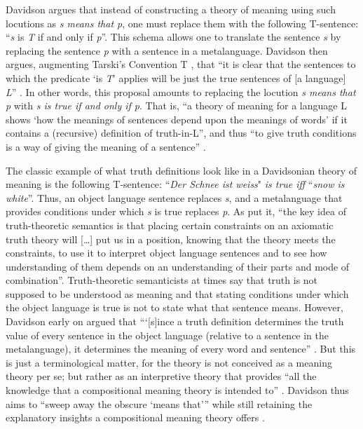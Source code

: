 Davidson argues that instead of constructing a theory of meaning using such locutions as \textit{s means that p}, one must replace them with the following T-sentence: “\textit{s} is \textit{T} if and only if \textit{p}”. This schema allows one to translate the sentence \textit{s} by replacing the sentence \textit{p} with a sentence in a metalanguage. Davidson then argues, augmenting Tarski’s Convention T \citep{Tarski1956}, that “it is clear that the sentences to which the predicate ‘is \textit{T}’ applies will be just the true sentences of [a language] \textit{L}” \citep[309]{Davidson1967}. In other words, this proposal amounts to replacing the locution \textit{s means that p} with \textit{s is true if and only if p}. That is, “a theory of meaning for a language L shows ‘how the meanings of sentences depend upon the meanings of words' if it contains a (recursive) definition of truth-in-L”, and thus “to give truth conditions is a way of giving the meaning of a sentence” \citep[310]{Davidson1967}.

The classic example of what truth definitions look like in a Davidsonian theory of meaning is the following T-sentence: “\textit{Der Schnee ist weiss}" \textit{is true iff} “\textit{snow is white}”. Thus, an object language sentence replaces \textit{s}, and a metalanguage that provides conditions under which \textit{s} is true replaces \textit{p}. As \citet[4]{LeporeLudwig2007} put it, “the key idea of truth-theoretic semantics is that placing certain constraints on an axiomatic truth theory will […] put us in a position, knowing that the theory meets the constraints, to use it to interpret object language sentences and to see how understanding of them depends on an understanding of their parts and mode of combination”. Truth-theoretic semanticists at times say that truth is not supposed to be understood as meaning and that stating conditions under which the object language is true is not to state what that sentence means. However, Davidson early on argued that “‘[s]ince a truth definition determines the truth value of every sentence in the object language (relative to a sentence in the metalanguage), it determines the meaning of every word and sentence” \citep[322, fn. 8]{Davidson1967}. But this is just a terminological matter, for the theory is not conceived as a meaning theory per se; but rather as an interpretive theory that provides “all the knowledge that a compositional meaning theory is intended to” \citep[317]{LeporeLudwig2004}. Davidson thus aims to “sweep away the obscure ‘means that’” while still retaining the explanatory insights a compositional meaning theory offers \citep[309]{Davidson1967}.

